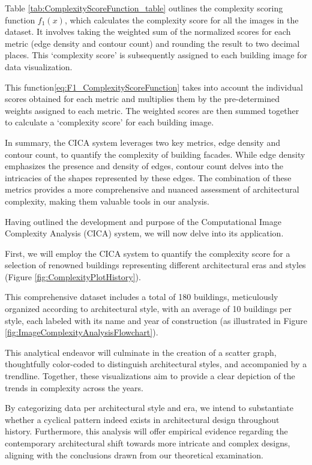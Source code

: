 Table \ref{tab:ComplexityScoreFunction_table} outlines the complexity scoring function \(f_1(x)\), which calculates the complexity score for all the images in the dataset.
It involves taking the weighted sum of the normalized scores for each metric (edge density and contour count) and rounding the result to two decimal places.
This `complexity score' is subsequently assigned to each building image for data visualization.


This function\ref{eq:F1_ComplexityScoreFunction} takes into account the individual scores obtained for each metric and multiplies them by the pre-determined weights assigned to each metric.
The weighted scores are then summed together to calculate a `complexity score' for each building image.

In summary, the CICA system leverages two key metrics, edge density and contour count, to quantify the complexity of building facades.
While edge density emphasizes the presence and density of edges, contour count delves into the intricacies of the shapes represented by these edges.
The combination of these metrics provides a more comprehensive and nuanced assessment of architectural complexity, making them valuable tools in our analysis.

Having outlined the development and purpose of the Computational Image Complexity Analysis (CICA) system, we will now delve into its application.

First, we will employ the CICA system to quantify the complexity score for a selection of renowned buildings representing different architectural eras and styles (Figure \ref{fig:ComplexityPlotHistory}).

This comprehensive dataset includes a total of 180 buildings, meticulously organized according to architectural style, with an average of 10 buildings per style, each labeled with its name and year of construction (as illustrated in Figure \ref{fig:ImageComplexityAnalysisFlowchart}).

This analytical endeavor will culminate in the creation of a scatter graph, thoughtfully color-coded to distinguish architectural styles, and accompanied by a trendline.
Together, these visualizations aim to provide a clear depiction of the trends in complexity across the years.

By categorizing data per architectural style and era, we intend to substantiate whether a cyclical pattern indeed exists in architectural design throughout history.
Furthermore, this analysis will offer empirical evidence regarding the contemporary architectural shift towards more intricate and complex designs, aligning with the conclusions drawn from our theoretical examination.

